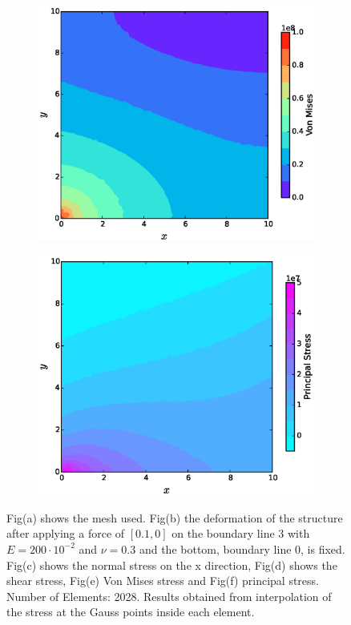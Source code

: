 \documentclass[11pt, a4paper]{article}
\numberwithin{equation}{section}
\begin{document}
\begin{figure}[H]
\begin{subfigure}[H]{0.49\textwidth}
		\caption{}
		\label{fig:1}
	\end{subfigure}
	\begin{subfigure}[H]{0.49\textwidth}
		\includegraphics[width=\textwidth]{fig/ex4_von_mises.eps}
		\caption{}
		\label{fig:2}
	\end{subfigure}
	\begin{subfigure}[H]{0.49\textwidth}
		\includegraphics[width=\textwidth]{fig/ex4_principal_stress.eps}
		\caption{}
		\label{fig:2}
	\end{subfigure}
	\caption{Fig(a) shows the mesh used. Fig(b) the deformation of the structure after applying a force of $[0.1, 0]$ on the boundary line 3 with $E=200 \cdot 10^{-2}$ and $\nu=0.3$ and the bottom, boundary line 0, is fixed. Fig(c) shows the normal stress on the x direction, Fig(d) shows the shear stress, Fig(e) Von Mises stress and Fig(f) principal stress. Number of Elements: 2028. Results obtained from interpolation of the stress at the Gauss points inside each element.}
	\label{fig:3_1}
\end{figure}
\end{document}

